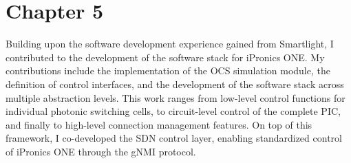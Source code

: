 \section*{Chapter 5}

Building upon the software development experience gained from Smartlight, I contributed to the development of the software stack for iPronics ONE.
My contributions include the implementation of the OCS simulation module, the definition of control interfaces, and the development of the software stack across multiple abstraction levels.
This work ranges from low-level control functions for individual photonic switching cells, to circuit-level control of the complete PIC, and finally to high-level connection management features.
On top of this framework, I co-developed the SDN control layer, enabling standardized control of iPronics ONE through the gNMI protocol.
